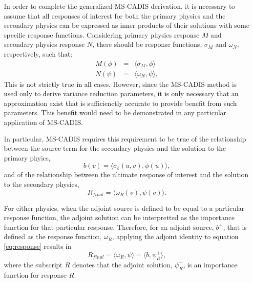In order to complete the generalized MS-CADIS derivation, it is necessary to
assume that all responses of interest for both the primary physics and the
secondary physics can be expressed as inner products of their solutions with
some specific response functions.  Considering primary physics response $M$
and secondary physics response $N$, there should be response functions,
$\sigma_M$ and $\omega_N$, respectively, such that:
\begin{eqnarray}

   M(\phi) &=& \langle \sigma_M , \phi \rangle\\
   N(\psi) &=& \langle \omega_N , \psi \rangle,

\end{eqnarray}
This is not strictly true in all cases.  However, since the
MS-CADIS method is used only to derive variance reduction parameters, it is
only necessary that an approximation exist that is sufficienctly accurate to
provide benefit from such parameters.  This benefit would need to be
demonstrated in any particular application of MS-CADIS.

In particular, MS-CADIS requires this requirement to be true of the
relationship between the source term for the secondary physics and the
solution to the primary phyics,
\begin{equation}\label{eq:coupling}
  b(v) = \langle \sigma_b(u,v), \phi(u) \rangle,
\end{equation}
and of the relationship between the ultimate response of interest and the
solution to the secondary physics,
\begin{equation} \label{eq:response}
  R_{final} = \langle \omega_R(v), \psi(v) \rangle.
\end{equation}

For either physics, when the adjoint source is defined to be equal to a
particular response function, the adjoint solution can be interpretted as the
importance function for that particular response.  Therefore, for an adjoint source,
$b^{+}$, that is defined as the response function, $\omega_R$, applying the
adjoint identity to equation \ref{eq:response} results in
\begin{equation}
  R_{final} = \langle \omega_R, \psi \rangle = \langle b, \psi_R^{+}\rangle,
\end{equation}
where the subscript $R$ denotes that the adjoint solution, $\psi_R^{+}$, is an
importance function for response $R$.

